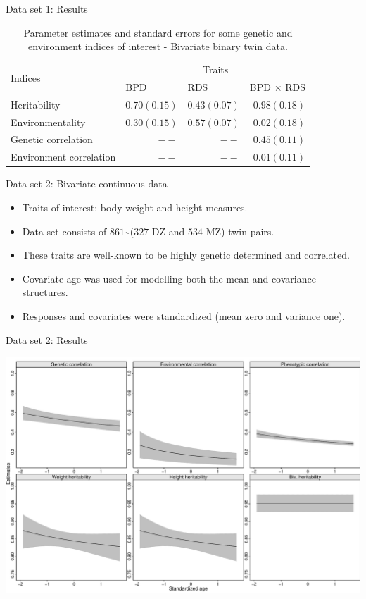 \documentclass[
  ignorenonframetext,
  serif,
  professionalfont,
  usenames,
  dvipsnames,
  aspectratio = 169]{beamer}
\providecommand{\tightlist}{%
  \setlength{\itemsep}{0pt}\setlength{\parskip}{0pt}}
\renewcommand{\tightlist}{%
  \setlength{\itemsep}{0\baselineskip}
  \setlength{\parskip}{0.25\baselineskip}
}
\begin{document}
\begin{frame}{Data set 1: Results}
\protect\hypertarget{data-set-1-results-1}{}
\begin{table}[]
\caption{Parameter estimates and standard errors for some genetic and environment indices of interest - Bivariate binary twin data.}
\label{tab:dataset3gen}
\begin{tabular}{lrrr}
\hline
\multicolumn{1}{|l|}{\multirow{2}{*}{Indices}} & \multicolumn{3}{c|}{Traits} \\ \cline{2-4} 
\multicolumn{1}{|l|}{} & \multicolumn{1}{l|}{BPD} & \multicolumn{1}{l|}{RDS} & \multicolumn{1}{l|}{BPD $\times$ RDS} \\ \hline
Heritability            & $0.70(0.15)$ & $0.43(0.07)$ & $0.98(0.18)$ \\
Environmentality        & $0.30(0.15)$ & $0.57(0.07)$ & $0.02(0.18)$  \\
Genetic correlation     & $--$         & $--$         & $0.45(0.11)$ \\
Environment correlation & $--$         & $--$         & $0.01(0.11)$ \\ \hline                                        
\end{tabular}
\end{table}
\end{frame}

\begin{frame}{Data set 2: Bivariate continuous data}
\protect\hypertarget{data-set-2-bivariate-continuous-data}{}
\begin{itemize}
\tightlist
\item
  Traits of interest: body weight and height measures.
\item
  Data set consists of \(861\)\textasciitilde(\(327\) DZ and \(534\) MZ)
  twin-pairs.
\item
  These traits are well-known to be highly genetic determined and
  correlated.
\item
  Covariate age was used for modelling both the mean and covariance
  structures.
\item
  Responses and covariates were standardized (mean zero and variance
  one).
\end{itemize}
\end{frame}

\begin{frame}{Data set 2: Results}
\protect\hypertarget{data-set-2-results}{}
\begin{center}\includegraphics[width=0.65\linewidth]{img/FigDataset4} \end{center}
\end{frame}
\end{document}
